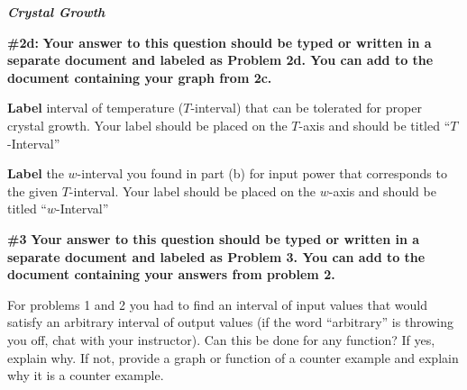 \documentclass[handout,nooutcomes]{ximera}
\begin{document}
\begin{problem}{\textbf{\textit{Crystal Growth}}}
    \begin{problem}{\textbf{\#2d:}}
    \textbf{Your answer to this question should be typed or written in a separate document and labeled as Problem 2d. You can add to the document containing your graph from 2c.}
    
    \textbf{Label} interval of temperature ($T$-interval) that can be tolerated for proper crystal growth. Your label should be placed on the $T$-axis and should be titled ``$T$-Interval''
    
	\textbf{Label} the $w$-interval you found in part (b) for input power that corresponds to the given $T$-interval. Your label should be placed on the $w$-axis and should be titled ``$w$-Interval''
    \end{problem}
    
\end{problem}

\begin{problem}{\textbf{\#3}}
\textbf{Your answer to this question should be typed or written in a separate document and labeled as Problem 3. You can add to the document containing your answers from problem 2.}

  For problems 1 and 2 you had to find an interval of input values that would satisfy an arbitrary interval of output values (if the word ``arbitrary'' is throwing you off, chat with your instructor). Can this be done for any function? If yes, explain why. If not, provide a graph or function of a counter example and explain why it is a counter example.
\end{problem}
\end{document}
